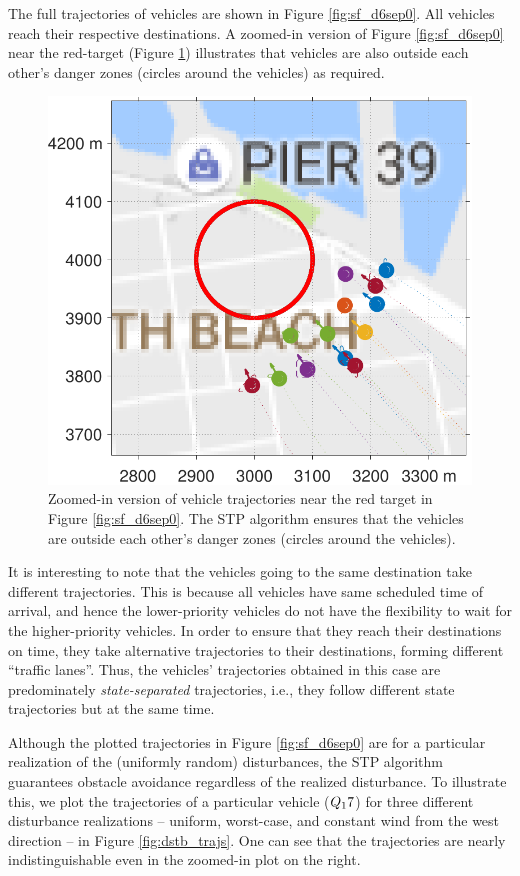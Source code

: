 The full trajectories of vehicles are shown in Figure \ref{fig:sf_d6sep0}. All vehicles reach their respective destinations. A zoomed-in version of Figure \ref{fig:sf_d6sep0} near the red-target (Figure \ref{fig:sf_d6sep0_zoomed}) illustrates that vehicles are also outside each other's danger zones (circles around the vehicles) as required. 
%
\begin{figure}[h]
  \centering
  \includegraphics[width=\columnwidth]{figs/sf_d6sep0_zoomed}
  \caption{Zoomed-in version of vehicle trajectories near the red target in Figure \ref{fig:sf_d6sep0}. The STP algorithm ensures that the vehicles are outside each other's danger zones (circles around the vehicles).} 
  \label{fig:sf_d6sep0_zoomed}
\end{figure}
It is interesting to note that the vehicles going to the same destination take different trajectories. This is because all vehicles have same scheduled time of arrival, and hence the lower-priority vehicles do not have the flexibility to wait for the higher-priority vehicles. In order to ensure that they reach their destinations on time, they take alternative trajectories to their destinations, forming different ``traffic lanes''. Thus, the vehicles' trajectories obtained in this case are predominately \textit{state-separated} trajectories, i.e., they follow different state trajectories but at the same time. 

Although the plotted trajectories in Figure \ref{fig:sf_d6sep0} are for a particular realization of the (uniformly random) disturbances, the STP algorithm guarantees obstacle avoidance regardless of the realized disturbance. To illustrate this, we plot the trajectories of a particular vehicle ($Q_17$) for three different disturbance realizations -- uniform, worst-case, and constant wind from the west direction -- in Figure \ref{fig:dstb_trajs}. One can see that the trajectories are nearly indistinguishable even in the zoomed-in plot on the right. 


